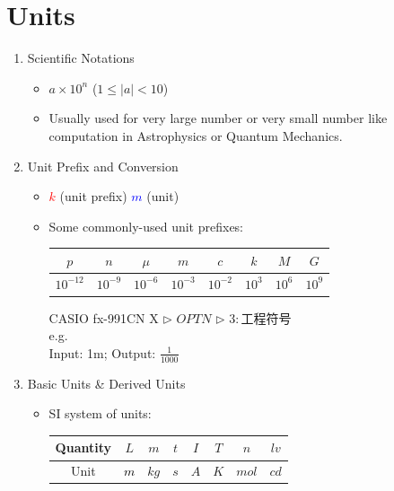 \documentclass{beamer}
\begin{document}
\section{Units}
\begin{frame}
  \begin{enumerate}[1.]
    \item Scientific Notations
    \begin{itemize}
      \item $ a\times 10^n$ ($1\leq |a| < 10$)
      \item Usually used for very large number or very small number like computation in Astrophysics or Quantum Mechanics.
    \end{itemize}
    \pause
    \item Unit Prefix and Conversion
    \begin{itemize}
      \item \textcolor{red}{$k$} (unit prefix) \textcolor{blue}{$m$} (unit)
      \item Some commonly-used unit prefixes:\\ 
      \begin{table}[H]
        \begin{tabular}{c|c|c|c|c|c|c|c}
        \hline
        $p$        & $n$       & $\mu$     & $m$       & $c$       & $k$      & $M$      & $G$      \\ \hline
        $10^{-12}$ & $10^{-9}$ & $10^{-6}$ & $10^{-3}$ & $10^{-2}$ & $10^{3}$ & $10^{6}$ & $10^{9}$ \\ \hline
        \end{tabular}
        \end{table}
        \pause
        CASIO fx-991CN X $\rhd$ $\boxed{OPTN}$ $\rhd$ $3:$工程符号\\
        e.g.\\Input: 1m; Output: $\frac{1}{1000}$
    \end{itemize}
    \pause
    \item Basic Units \& Derived Units
    \begin{itemize}
      \item SI system of units: 
      \begin{table}[H]
        \begin{tabular}{c|c|c|c|c|c|c|c}
        \hline
        Quantity & $L$        & $m$       & $t$       & $I$       & $T$       & $n$      & $lv$     \\ \hline
        Unit     & \textcolor{black}{$m$} & $kg$& $s$ & $A$ & $K$ & $mol$ & $cd$ \\ \hline
        \end{tabular}
        \end{table}
    \end{itemize}
  \end{enumerate}
\end{frame}
\end{document}
